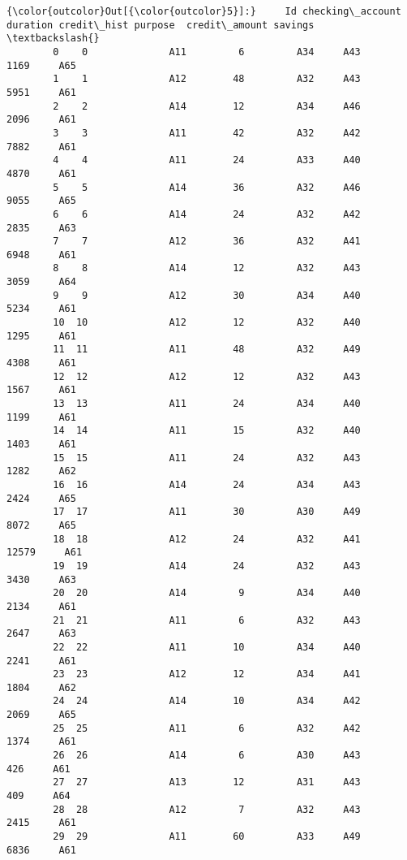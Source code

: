 \documentclass[11pt]{article}
\begin{document}
\begin{Verbatim}[commandchars=\\\{\}]
{\color{outcolor}Out[{\color{outcolor}5}]:}     Id checking\_account  duration credit\_hist purpose  credit\_amount savings  \textbackslash{}
        0    0              A11         6         A34     A43           1169     A65   
        1    1              A12        48         A32     A43           5951     A61   
        2    2              A14        12         A34     A46           2096     A61   
        3    3              A11        42         A32     A42           7882     A61   
        4    4              A11        24         A33     A40           4870     A61   
        5    5              A14        36         A32     A46           9055     A65   
        6    6              A14        24         A32     A42           2835     A63   
        7    7              A12        36         A32     A41           6948     A61   
        8    8              A14        12         A32     A43           3059     A64   
        9    9              A12        30         A34     A40           5234     A61   
        10  10              A12        12         A32     A40           1295     A61   
        11  11              A11        48         A32     A49           4308     A61   
        12  12              A12        12         A32     A43           1567     A61   
        13  13              A11        24         A34     A40           1199     A61   
        14  14              A11        15         A32     A40           1403     A61   
        15  15              A11        24         A32     A43           1282     A62   
        16  16              A14        24         A34     A43           2424     A65   
        17  17              A11        30         A30     A49           8072     A65   
        18  18              A12        24         A32     A41          12579     A61   
        19  19              A14        24         A32     A43           3430     A63   
        20  20              A14         9         A34     A40           2134     A61   
        21  21              A11         6         A32     A43           2647     A63   
        22  22              A11        10         A34     A40           2241     A61   
        23  23              A12        12         A34     A41           1804     A62   
        24  24              A14        10         A34     A42           2069     A65   
        25  25              A11         6         A32     A42           1374     A61   
        26  26              A14         6         A30     A43            426     A61   
        27  27              A13        12         A31     A43            409     A64   
        28  28              A12         7         A32     A43           2415     A61   
        29  29              A11        60         A33     A49           6836     A61   
        

\end{Verbatim}
\end{document}
